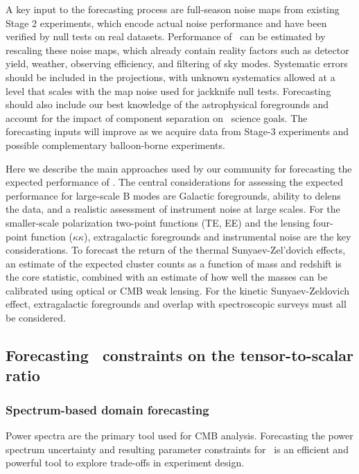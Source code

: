 A key input to the forecasting process are full-season noise maps from existing Stage 2 experiments, which encode actual noise performance and have been verified by null tests on real datasets.
Performance of \cmbexp\ can be estimated by rescaling these noise maps, which already contain reality factors such as detector yield, weather, observing efficiency, and filtering of sky modes.
Systematic errors should be included in the projections, with unknown systematics allowed at a level that scales with the map noise used for jackknife null tests.
Forecasting should also include our best knowledge of the astrophysical foregrounds and account for the impact of component separation on \cmbexp\ science goals.
The forecasting inputs will improve as we acquire data from Stage-3 experiments and possible complementary balloon-borne experiments.

Here we describe the main approaches used by our community for forecasting the expected performance of \cmbexp. The central considerations for assessing the expected performance for large-scale B modes are Galactic foregrounds, ability to delens the data, and a realistic assessment of instrument noise at large scales. 
For the smaller-scale polarization two-point functions (TE, EE) and the lensing four-point function ($\kappa \kappa$), extragalactic foregrounds and instrumental noise are the key considerations.
To forecast the return of the thermal Sunyaev-Zel'dovich effects, an estimate of the expected cluster counts as a function of mass and redshift is the core statistic, combined with an estimate of how well the masses can be calibrated using optical or CMB weak lensing. For the kinetic Sunyaev-Zeldovich effect, extragalactic foregrounds and overlap with spectroscopic surveys must all be considered. 

\subsection{Forecasting \cmbexp\ constraints on the tensor-to-scalar ratio}

\subsubsection{Spectrum-based domain forecasting}
\label{sec_specforecast}

Power spectra are the primary tool used for CMB analysis.
Forecasting the power spectrum uncertainty and resulting parameter constraints for \cmbexp\ is an efficient and powerful tool to explore trade-offs in experiment design.

